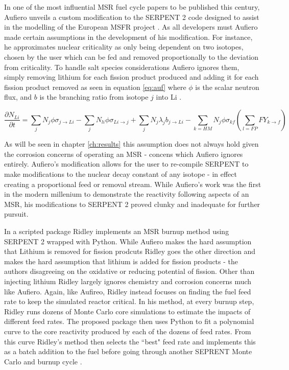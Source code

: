 In one of the most influential MSR fuel cycle papers to be published this
century, Aufiero unveils a custom modification to the SERPENT 2 code designed to
assist in the modelling of the European MSFR project \cite{Aufiero}. As all
developers must Aufiero made certain assumptions in the development of his
modification. For instance, he
 approximates nuclear criticality as only being dependent 
on two isotopes, chosen by the user which can be fed and removed proportionally
to the deviation from criticality. To handle salt species considerations Aufiero
ignores them, simply removing lithium for each fission product produced and
adding it for each fission product removed as seen in equation \ref{eq:auf} 
where $\phi$ is the scalar neutron flux, and $b$ is the branching ratio
from isotope $j$ into Li \cite{Aufiero}. 

\begin{equation} \label{eq:auf}
\frac{\partial N_{Li}}{\partial t} = \sum_{j} N_{j} \phi \sigma_{j \rightarrow
    Li} - \sum_{j} N_{li} \phi \sigma_{Li \rightarrow j} + \sum_{j} N_{j}
    \lambda_{j} b_{j \rightarrow Li} - \sum_{k = HM} N_{j} \phi \sigma_{kf}
    \left ( \sum_{l=FP}FY_{k \rightarrow f} \right )
\end{equation}

As will be seen in chapter \ref{ch:results} this assumption does not always hold
given the corrosion concerns of operating an MSR - concens which Aufiero ignores
entirely. Aufiero's modification allows for the user to re-compile SERPENT to
make modifications to the nuclear decay constant of any isotope - in effect 
creating a proportional feed or removal stream. While Aufiero's work was the
first in the modern millenium to demonstrate the reactivity following aspects
of an MSR, his modifications to SERPENT 2 proved clunky and inadequate for
further pursuit.

In a scripted package Ridley implements an MSR burnup method using SERPENT 2
wrapped with Python. While Aufiero makes the hard assumption that Lithium is
removed for fission prodcuts Ridley goes the other direction and makes the
hard assumption that lithium is added for fission products - the authors
disagreeing on the oxidative or reducing potential of fission. Other than
injecting lithium Ridley largely ignores chemistry and corrosion concerns much
like Aufiero. Again, like Aufireo, Ridley instead focuses on finding the fuel
feed rate to keep the simulated reactor critical. In his method, at every
burnup step, Ridley runs dozens of Monte Carlo core simulations to estimate
the impacts of different feed rates. The proposed package then uses Python to
fit a polynomial curve to the core reactivity produced by each of the dozens
of feed rates. From this curve Ridley's method then selects the ``best" feed
rate and implements this as a batch addition to the fuel before going through
another SEPRENT Monte Carlo and burnup cycle \cite{Ridley}. 

